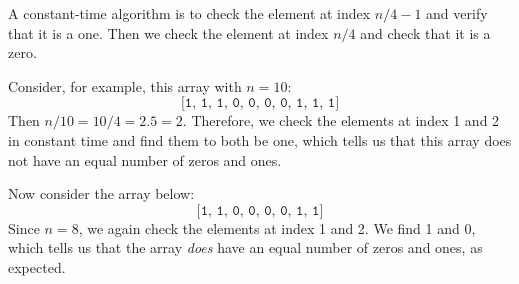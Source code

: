 \begin{prob}
\begin{subprobset}
\begin{subprob}
\begin{soln}
                A constant-time algorithm is to check the element at index $n/4
                - 1$ and verify that it is a one. Then we check the element at
                index $n/4 $ and check that it is a zero.

                Consider, for example, this array with $n = 10$:
                \[
                    \texttt{[1, 1, 1, 0, 0, 0, 0, 1, 1, 1]}
                \]
                Then $n / 10 = 10 / 4 = 2.5 = 2$. Therefore, we check the
                elements at index 1 and 2 in constant time and find them to
                both be one, which tells us that this array does not have an
                equal number of zeros and ones.

                Now consider the array below:
                \[
                    \texttt{[1, 1, 0, 0, 0, 0, 1, 1]}
                \]
                Since $n = 8$, we again check the elements at index 1 and 2. We find 1
                and 0, which tells us that the array \textit{does} have an equal number
                of zeros and ones, as expected.
            \end{soln}

        \end{subprob}

    \end{subprobset}

\end{prob}
